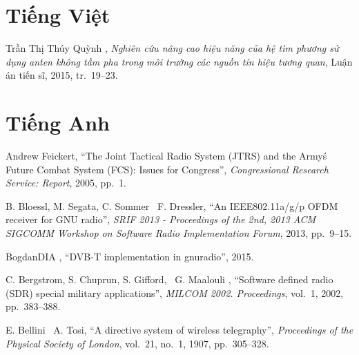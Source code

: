 \documentclass[a4paper,12pt,oneside]{book}%
\renewcommand{\baselinestretch}{1.4}
\begin{document}
\appendix

\def\baselinestretch{1}
\vspace{-2cm}
\renewcommand{\bibname}{Tài liệu tham khảo}
\clearpage
{}
{}
\renewcommand{\refname}{Literary works}
\begin{thebibliography}{xx}
	\section*{Tiếng Việt}
	\vspace{0.3cm}
	Trần Thị Thúy Quỳnh , {\em {Nghi{\^{e}}n cứu
			n{\^{a}}ng cao hiệu năng của hệ t{\`{i}}m phương sử dụng anten
			kh{\^{o}}ng tầm pha trong m{\^{o}}i trường c{\'{a}}c nguồn t{\'{i}}n
			hiệu tương quan}}, Luận án tiến sĩ, 2015, tr.~19--23.
	\vspace{0.5cm}	
	\section*{Tiếng Anh}	
	
	Andrew Feickert, ``{The Joint Tactical
		Radio System (JTRS) and the Army{\'{s}} Future Combat System (FCS): Issues
		for Congress}'', {\em Congressional Research Service: Report}, 2005, pp.~1.
	
	B. Bloessl, M. Segata, C. Sommer \harvardand\ F. Dressler, ``An IEEE802.11a/g/p OFDM receiver for GNU radio'',
	{\em SRIF 2013 - Proceedings of the 2nd, 2013 ACM SIGCOMM Workshop on
	Software Radio Implementation Forum}, 2013, pp.~9--15.

	BogdanDIA  , ``{DVB-T implementation in gnuradio}'', 2015.

	C. Bergstrom, S. Chuprun, S. Gifford, \harvardand\ G. Maalouli
	, ``{Software defined radio (SDR)
	special military applications}'', {\em MILCOM 2002. Proceedings},
	{vol.~1}, 2002, pp.~383--388.
	
	E. Bellini \harvardand\ A. Tosi,
	``{A directive system of wireless telegraphy}'', {\em Proceedings of the
		Physical Society of London}, vol.~21, no.~1, 1907, pp.~305--328.
	

\end{thebibliography}
\end{document}
